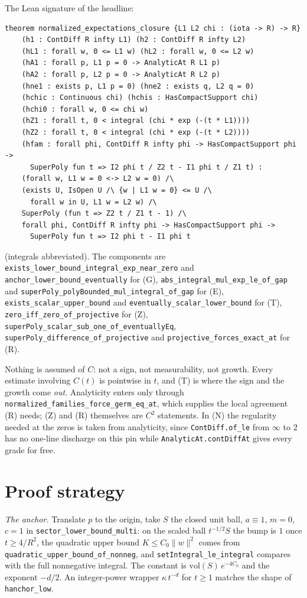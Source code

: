 \documentclass[11pt]{article}
\newcommand{\code}[1]{\texttt{#1}}
\begin{document}
\noindent The Lean signature of the headline:
\begin{verbatim}
theorem normalized_expectations_closure {L1 L2 chi : (iota -> R) -> R}
    (h1 : ContDiff R infty L1) (h2 : ContDiff R infty L2)
    (hL1 : forall w, 0 <= L1 w) (hL2 : forall w, 0 <= L2 w)
    (hA1 : forall p, L1 p = 0 -> AnalyticAt R L1 p)
    (hA2 : forall p, L2 p = 0 -> AnalyticAt R L2 p)
    (hne1 : exists p, L1 p = 0) (hne2 : exists q, L2 q = 0)
    (hchic : Continuous chi) (hchis : HasCompactSupport chi)
    (hchi0 : forall w, 0 <= chi w)
    (hZ1 : forall t, 0 < integral (chi * exp (-(t * L1))))
    (hZ2 : forall t, 0 < integral (chi * exp (-(t * L2))))
    (hfam : forall phi, ContDiff R infty phi -> HasCompactSupport phi ->
      SuperPoly fun t => I2 phi t / Z2 t - I1 phi t / Z1 t) :
    (forall w, L1 w = 0 <-> L2 w = 0) /\
    (exists U, IsOpen U /\ {w | L1 w = 0} <= U /\
      forall w in U, L1 w = L2 w) /\
    SuperPoly (fun t => Z2 t / Z1 t - 1) /\
    forall phi, ContDiff R infty phi -> HasCompactSupport phi ->
      SuperPoly fun t => I2 phi t - I1 phi t
\end{verbatim}
(integrals abbreviated). The components are
\code{exists\_lower\_bound\_integral\_exp\_near\_zero} and
\code{anchor\_lower\_bound\_eventually} for (G),
\code{abs\_integral\_mul\_exp\_le\_of\_gap} and
\code{superPoly\_polyBounded\_mul\_integral\_of\_gap} for (E),
\code{exists\_scalar\_upper\_bound} and
\code{eventually\_scalar\_lower\_bound} for (T),
\code{zero\_iff\_zero\_of\_projective} for (Z),
\code{superPoly\_scalar\_sub\_one\_of\_eventuallyEq},
\code{superPoly\_difference\_of\_projective} and
\code{projective\_forces\_exact\_at} for (R).

Nothing is assumed of $C$: not a sign, not measurability, not growth.
Every estimate involving $C(t)$ is pointwise in $t$, and (T) is where the
sign and the growth come \emph{out}. Analyticity enters only through
\code{normalized\_families\_force\_germ\_eq\_at}, which supplies the
local agreement (R) needs; (Z) and (R) themselves are $C^2$ statements.
In (N) the regularity needed at the zeros is taken from analyticity,
since \code{ContDiff.of\_le} from $\infty$ to $2$ has no one-line
discharge on this pin while \code{AnalyticAt.contDiffAt} gives every
grade for free.

\section{Proof strategy}

\emph{The anchor.} Translate $p$ to the origin, take $S$ the closed unit
ball, $a \equiv 1$, $m = 0$, $c = 1$ in \code{sector\_lower\_bound\_multi}:
on the scaled ball $t^{-1/2}S$ the bump is $1$ once $t \ge 4/R^2$, the
quadratic upper bound $K \le C_0\|w\|^2$ comes from
\code{quadratic\_upper\_bound\_of\_nonneg}, and
\code{setIntegral\_le\_integral} compares with the full nonnegative
integral. The constant is $\mathrm{vol}(S)\,e^{-4C_0}$ and the exponent
$-d/2$. An integer-power wrapper $\kappa\,t^{-d}$ for $t \ge 1$ matches
the shape of \code{hanchor\_low}.
\end{document}
